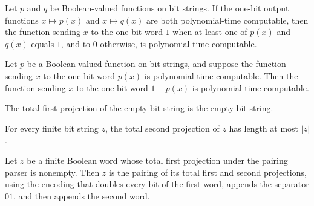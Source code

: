 \begin{theorem}
\label{Complexity.polyTimeComputable_or}
\leanok
{}
Let $p$ and $q$ be Boolean-valued functions on bit strings. If the one-bit output
functions $x\mapsto p(x)$ and $x\mapsto q(x)$ are both polynomial-time computable, then
the function sending $x$ to the one-bit word $1$ when at least one of $p(x)$ and $q(x)$
equals $1$, and to $0$ otherwise, is polynomial-time computable.
\end{theorem}

\begin{theorem}
\label{Complexity.polyTimeComputable_not}
\leanok
{}
Let $p$ be a Boolean-valued function on bit strings, and suppose the function sending
$x$ to the one-bit word $p(x)$ is polynomial-time computable. Then the function sending
$x$ to the one-bit word $1-p(x)$ is polynomial-time computable.
\end{theorem}

\begin{theorem}
\label{Complexity.pairFstD_nil}
\leanok
{}
The total first projection of the empty bit string is the empty bit string.
\end{theorem}

\begin{theorem}
\label{Complexity.length_pairSndD_le}
\leanok
{}
For every finite bit string $z$, the total second projection of $z$ has length at most
$|z|$.
\end{theorem}

\begin{theorem}
\label{Complexity.eq_pairEncode_of_pairFstD_ne}
\leanok
{}
Let $z$ be a finite Boolean word whose total first projection under the pairing parser
is nonempty. Then $z$ is the pairing of its total first and second projections, using
the encoding that doubles every bit of the first word, appends the separator $01$, and
then appends the second word.
\end{theorem}


